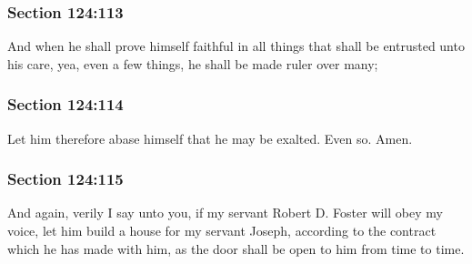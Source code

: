 	\subsubsection{Section 124:113} %
		\label{DC124-113}

		And when he shall prove himself faithful in all things that shall be entrusted unto his care, yea, even a few things, he shall be made ruler over many;


	\subsubsection{Section 124:114} %
		\label{DC124-114}

		Let him therefore abase himself that he may be exalted.  Even so.  Amen.


	\subsubsection{Section 124:115} %
		\label{DC124-115}

		And again, verily I say unto you, if my servant Robert D. Foster will obey my voice, let him build a house for my servant Joseph, according to the contract which he has made with him, as the door shall be open to him from time to time.


